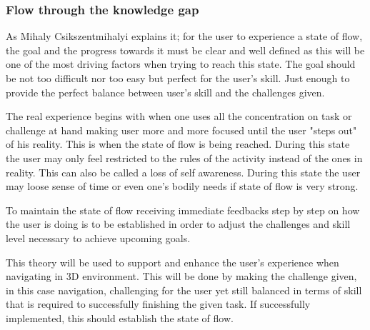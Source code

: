 \subsubsection{Flow through the knowledge gap}

As Mihaly Csikszentmihalyi \cite{Flow} explains it; for the user to experience a state of flow, the goal and the progress towards it must be clear and well defined as this will be one of the most driving factors when trying to reach this state. The goal should be not too difficult nor too easy but perfect for the user's skill. Just enough to provide the perfect balance between user's skill and the challenges given.\cite{Flow}
	
The real experience begins with when one uses all the concentration on task or challenge at hand making user more and more focused until the user "steps out" of his reality. This is when the state of flow is being reached. \cite{Flow} During this state the user may only feel restricted to the rules of the activity instead of the ones in reality. This can also be called a loss of self awareness. During this state the user may loose sense of time or even one's bodily needs if state of flow is very strong.\cite{Flow}
	
To maintain the state of flow receiving immediate feedbacks step by step on how the user is doing is to be established in order to adjust the challenges and skill level necessary to achieve upcoming goals. \cite{Flow} 

This theory will be used to support and enhance the user's experience when navigating in 3D environment. This will be done by making the challenge given, in this case navigation, challenging for the user yet still balanced in terms of skill that is required to successfully finishing the given task. If successfully implemented, this should establish the state of flow. \cite{Flow} 
